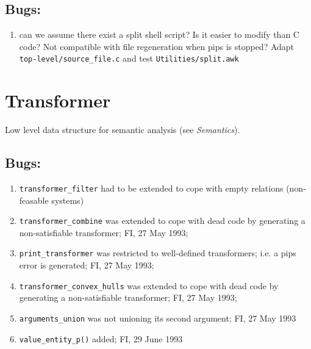 \subsection{Bugs:}

\begin{enumerate}

  \item can we assume there exist a split shell script? Is it easier
        to modify than C code? Not compatible with file regeneration
        when pips is stopped? Adapt \verb+top-level/source_file.c+
        and test \verb+Utilities/split.awk+

\end{enumerate}

\section{Transformer}

Low level data structure for semantic analysis (see {\em Semantics}).

\subsection{Bugs:}

\begin{enumerate}

  \item \verb+transformer_filter+ had to be extended to cope with
        empty relations (non-feasable systems)

  \item \verb+transformer_combine+ was extended to cope with dead code
        by generating a non-satisfiable transformer; FI, 27 May 1993;

  \item \verb+print_transformer+ was restricted to well-defined
        transformers; i.e. a pips error is generated; FI, 27 May 1993;
        
  \item \verb+transformer_convex_hulls+ was extended to cope with dead code
        by generating a non-satisfiable transformer; FI, 27 May 1993;

  \item \verb+arguments_union+ was not unioning its second argument;
        FI, 27 May 1993

  \item \verb+value_entity_p()+ added; FI, 29 June 1993

\end{enumerate}

